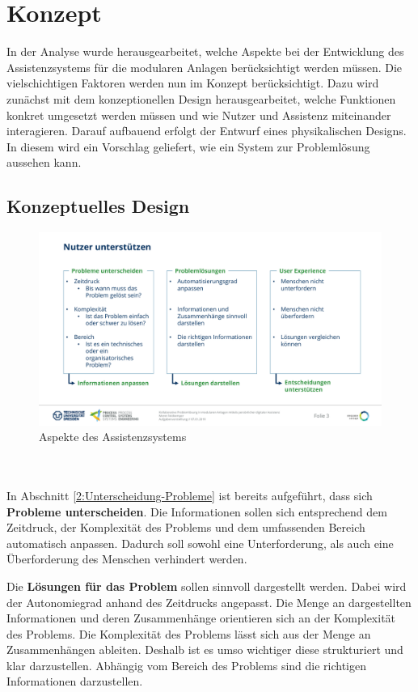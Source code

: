 \chapter{Konzept}
\label{sec:Konzept}
In der Analyse wurde herausgearbeitet, welche Aspekte bei der Entwicklung des Assistenzsystems für die modularen Anlagen berücksichtigt werden müssen. Die vielschichtigen Faktoren werden nun im Konzept berücksichtigt. Dazu wird zunächst mit dem konzeptionellen Design herausgearbeitet, welche Funktionen konkret umgesetzt werden müssen und wie Nutzer und Assistenz miteinander interagieren. Darauf aufbauend erfolgt der Entwurf eines physikalischen Designs. In diesem wird ein Vorschlag geliefert, wie ein System zur Problemlösung aussehen kann.

\section{Konzeptuelles Design}
\begin{figure}[htbp]
\centering
\includegraphics[scale=0.45]{DA_files/Bilder/Konzept/Nutzer-unterstuetzen.pdf}
\caption{Aspekte des Assistenzsystems}
\label{pic:Nutzer-Unterstuetzen}
\end{figure}
\\ \\
In Abschnitt \ref{2:Unterscheidung-Probleme} ist bereits aufgeführt, dass sich \textbf{Probleme unterscheiden}. Die Informationen sollen sich entsprechend dem Zeitdruck, der Komplexität des Problems und dem umfassenden Bereich automatisch anpassen. Dadurch soll sowohl eine Unterforderung, als auch eine Überforderung des Menschen verhindert werden.

Die \textbf{Lösungen für das Problem} sollen sinnvoll dargestellt werden. Dabei wird der Autonomiegrad anhand des Zeitdrucks angepasst. Die Menge an dargestellten Informationen und deren Zusammenhänge orientieren sich an der Komplexität des Problems. Die Komplexität des Problems lässt sich aus der Menge an Zusammenhängen ableiten. Deshalb ist es umso wichtiger diese strukturiert und klar darzustellen. Abhängig vom Bereich des Problems sind die richtigen Informationen darzustellen.

